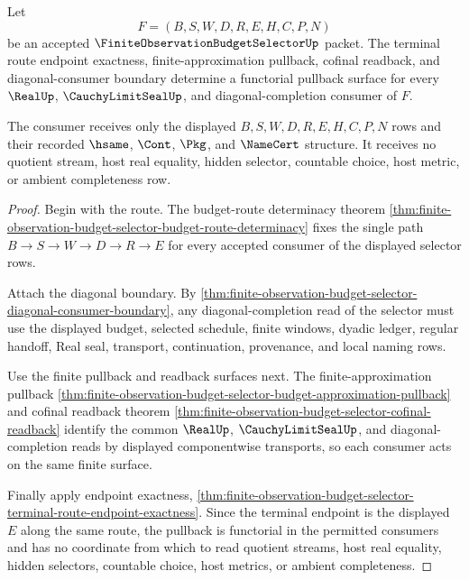 \begin{theorem}
\label{thm:finite-observation-budget-selector-terminal-diagonal-pullback-functoriality}
Let
$$
F=(B,S,W,D,R,E,H,C,P,N)
$$
be an accepted $\FiniteObservationBudgetSelectorUp$ packet. The terminal route endpoint exactness, finite-approximation pullback, cofinal readback, and diagonal-consumer boundary determine a functorial pullback surface for every $\RealUp$, $\CauchyLimitSealUp$, and diagonal-completion consumer of $F$.

The consumer receives only the displayed $B,S,W,D,R,E,H,C,P,N$ rows and their recorded $\hsame$, $\Cont$, $\Pkg$, and $\NameCert$ structure. It receives no quotient stream, host real equality, hidden selector, countable choice, host metric, or ambient completeness row.
\end{theorem}
\begin{proof}
Begin with the route. The budget-route determinacy theorem \autoref{thm:finite-observation-budget-selector-budget-route-determinacy} fixes the single path $B \to S \to W \to D \to R \to E$ for every accepted consumer of the displayed selector rows.

Attach the diagonal boundary. By \autoref{thm:finite-observation-budget-selector-diagonal-consumer-boundary}, any diagonal-completion read of the selector must use the displayed budget, selected schedule, finite windows, dyadic ledger, regular handoff, Real seal, transport, continuation, provenance, and local naming rows.

Use the finite pullback and readback surfaces next. The finite-approximation pullback \autoref{thm:finite-observation-budget-selector-budget-approximation-pullback} and cofinal readback theorem \autoref{thm:finite-observation-budget-selector-cofinal-readback} identify the common $\RealUp$, $\CauchyLimitSealUp$, and diagonal-completion reads by displayed componentwise transports, so each consumer acts on the same finite surface.

Finally apply endpoint exactness, \autoref{thm:finite-observation-budget-selector-terminal-route-endpoint-exactness}. Since the terminal endpoint is the displayed $E$ along the same route, the pullback is functorial in the permitted consumers and has no coordinate from which to read quotient streams, host real equality, hidden selectors, countable choice, host metrics, or ambient completeness.
\end{proof}

